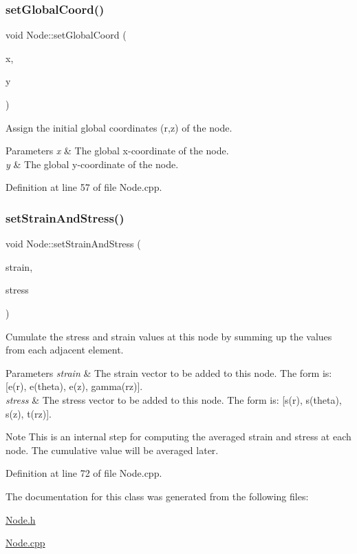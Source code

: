 \subsubsection{\texorpdfstring{set\+Global\+Coord()}{setGlobalCoord()}}
{\footnotesize\ttfamily void Node\+::set\+Global\+Coord (\begin{DoxyParamCaption}\item[{const double \&}]{x,  }\item[{const double \&}]{y }\end{DoxyParamCaption})}



Assign the initial global coordinates (r,z) of the node. 


\begin{DoxyParams}{Parameters}
{\em x} & The global x-\/coordinate of the node. \\
\hline
{\em y} & The global y-\/coordinate of the node. \\
\hline
\end{DoxyParams}


Definition at line 57 of file Node.\+cpp.

\mbox{\label{class_node_a31e8635344b96ab5df9e6df5e5466533}} 
\subsubsection{\texorpdfstring{set\+Strain\+And\+Stress()}{setStrainAndStress()}}
{\footnotesize\ttfamily void Node\+::set\+Strain\+And\+Stress (\begin{DoxyParamCaption}\item[{const Vector\+Xd \&}]{strain,  }\item[{const Vector\+Xd \&}]{stress }\end{DoxyParamCaption})}



Cumulate the stress and strain values at this node by summing up the values from each adjacent element. 


\begin{DoxyParams}{Parameters}
{\em strain} & The strain vector to be added to this node. The form is\+: \mbox{[}e(r), e(theta), e(z), gamma(rz)\mbox{]}. \\
\hline
{\em stress} & The stress vector to be added to this node. The form is\+: \mbox{[}s(r), s(theta), s(z), t(rz)\mbox{]}.\\
\hline
\end{DoxyParams}
\begin{DoxyNote}{Note}
This is an internal step for computing the averaged strain and stress at each node. The cumulative value will be averaged later. 
\end{DoxyNote}


Definition at line 72 of file Node.\+cpp.



The documentation for this class was generated from the following files\+:\begin{DoxyCompactItemize}
\item 
\mbox{\hyperlink{_node_8h}{Node.\+h}}\item 
\mbox{\hyperlink{_node_8cpp}{Node.\+cpp}}\end{DoxyCompactItemize}
